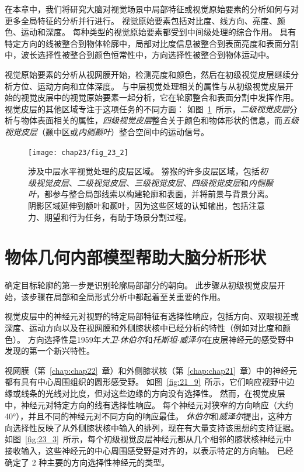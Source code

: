 在本章中，我们将研究大脑对视觉场景中局部特征或视觉原始要素的分析如何与对更多全局特征的分析并行进行。
视觉原始要素包括对比度、线方向、亮度、颜色、运动和深度。
每种类型的视觉原始要素都受到中间级处理的综合作用。
具有特定方向的线被整合到物体轮廓中，局部对比度信息被整合到表面亮度和表面分割中，波长选择性被整合到颜色恒常性中，方向选择性被整合到物体运动中。


视觉原始要素的分析从视网膜开始，检测亮度和颜色，然后在初级视觉皮层继续分析方位、运动方向和立体深度。
与中层视觉处理相关的属性与从初级视觉皮层开始的视觉皮层中的视觉原始要素一起分析，它在轮廓整合和表面分割中发挥作用。
视觉皮层的其他区域专注于这项任务的不同方面：
如图~\ref{fig:23_2}~所示，\textit{二级视觉皮层}分析与物体表面相关的属性，\textit{四级视觉皮层}整合关于颜色和物体形状的信息，而\textit{五级视觉皮层}（颞中区或\textit{内侧颞叶}）整合空间中的运动信号。


\begin{figure}[htbp]
	\centering
	\texttt{[image: chap23/fig\_23\_2]}
	\caption{涉及中层水平视觉处理的皮层区域。
		猕猴的许多皮层区域，包括\textit{初级视觉皮层}、\textit{二级视觉皮层}、\textit{三级视觉皮层}、\textit{四级视觉皮层}和\textit{内侧颞叶}，都参与整合局部线索以构建轮廓和表面，并将前景与背景分离。
		阴影区域延伸到额叶和颞叶，因为这些区域的认知输出，包括注意力、期望和行为任务，有助于场景分割过程。}
	\label{fig:23_2}
\end{figure}



\section{物体几何内部模型帮助大脑分析形状}

确定目标轮廓的第一步是识别轮廓局部部分的朝向。
此步骤从初级视觉皮层开始，该步骤在局部和全局形式分析中都起着至关重要的作用。


视觉皮层中的神经元对视野的特定局部特征有选择性响应，包括方向、双眼视差或深度、运动方向以及在视网膜和外侧膝状核中已经分析的特性（例如对比度和颜色）。
方向选择性是1959年\textit{大卫$\cdot$休伯尔}和\textit{托斯坦$\cdot$威泽尔}在皮层神经元的感受野中发现的第一个新兴特性。


视网膜（第~\ref{chap:chap22}~章）和外侧膝状核（第~\ref{chap:chap21}~章）中的神经元都有具有中心周围组织的圆形感受野。
如图~\ref{fig:21_9}~所示，它们响应视野中边缘或线条的光线对比度，但对这些边缘的方向没有选择性。
然而，在视觉皮层中，神经元对特定方向的线有选择性响应。
每个神经元对狭窄的方向响应（大约40°），并且不同的神经元对不同方向的响应最佳。
\textit{休伯尔}和\textit{威泽尔}提出，这种方向选择性反映了从外侧膝状核中输入的排列，现在有大量支持该思想的支持证据。
如图~\ref{fig:23_3}~所示，每个初级视觉皮层神经元都从几个相邻的膝状核神经元中接收输入，这些神经元的中心周围感受野是对齐的，以表示特定的方向轴。
已经确定了 2 种主要的方向选择性神经元的类型。


